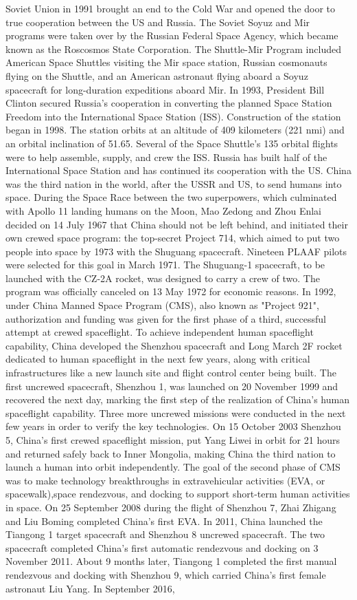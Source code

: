 \documentclass[12pt]{article}
\begin{document}
Soviet Union in 1991 brought an end to the Cold War and opened the door to true cooperation between the US and Russia. The Soviet Soyuz and Mir programs were taken over by the Russian Federal Space Agency, which became known as the Roscosmos State Corporation. The Shuttle-Mir Program included American Space Shuttles visiting the Mir space station, Russian cosmonauts flying on the Shuttle, and an American astronaut flying aboard a Soyuz spacecraft for long-duration expeditions aboard Mir. In 1993, President Bill Clinton secured Russia's cooperation in converting the planned Space Station Freedom into the International Space Station (ISS). Construction of the station began in 1998. The station orbits at an altitude of 409 kilometers (221 nmi) and an orbital inclination of 51.65. Several of the Space Shuttle's 135 orbital flights were to help assemble, supply, and crew the ISS. Russia has built half of the International Space Station and has continued its cooperation with the US. China was the third nation in the world, after the USSR and US, to send humans into space. During the Space Race between the two superpowers, which culminated with Apollo 11 landing humans on the Moon, Mao Zedong and Zhou Enlai decided on 14 July 1967 that China should not be left behind, and initiated their own crewed space program: the top-secret Project 714, which aimed to put two people into space by 1973 with the Shuguang spacecraft. Nineteen PLAAF pilots were selected for this goal in March 1971. The Shuguang-1 spacecraft, to be launched with the CZ-2A rocket, was designed to carry a crew of two. The program was officially canceled on 13 May 1972 for economic reasons. In 1992, under China Manned Space Program (CMS), also known as "Project 921", authorization and funding was given for the first phase of a third, successful attempt at crewed spaceflight. To achieve independent human spaceflight capability, China developed the Shenzhou spacecraft and Long March 2F rocket dedicated to human spaceflight in the next few years, along with critical infrastructures like a new launch site and flight control center being built. The first uncrewed spacecraft, Shenzhou 1, was launched on 20 November 1999 and recovered the next day, marking the first step of the realization of China's human spaceflight capability. Three more uncrewed missions were conducted in the next few years in order to verify the key technologies. On 15 October 2003 Shenzhou 5, China's first crewed spaceflight mission, put Yang Liwei in orbit for 21 hours and returned safely back to Inner Mongolia, making China the third nation to launch a human into orbit independently. The goal of the second phase of CMS was to make technology breakthroughs in extravehicular activities (EVA, or spacewalk),space rendezvous, and docking to support short-term human activities in space. On 25 September 2008 during the flight of Shenzhou 7, Zhai Zhigang and Liu Boming completed China's first EVA. In 2011, China launched the Tiangong 1 target spacecraft and Shenzhou 8 uncrewed spacecraft. The two spacecraft completed China's first automatic rendezvous and docking on 3 November 2011. About 9 months later, Tiangong 1 completed the first manual rendezvous and docking with Shenzhou 9, which carried China's first female astronaut Liu Yang. In September 2016, 
\end{document}
